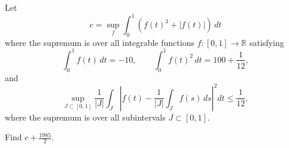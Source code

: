 \documentclass{article}
\begin{document}
Let
\[
c=\sup_f\int_0^1\left(f(t)^3+|f(t)|\right)\,dt
\]
where the supremum is over all integrable functions
\(f:[0,1]\to\mathbb R\) satisfying
\[
\int_0^1 f(t)\,dt=-10,\qquad
\int_0^1 f(t)^2\,dt=100+\frac1{12},
\]
and
\[
\sup_{J\subset[0,1]}\frac1{|J|}\int_J
\left|f(t)-\frac1{|J|}\int_J f(s)\,ds\right|^2dt
\leq\frac1{12},
\]
where the supremum is over all subintervals \(J\subset[0,1]\).

Find \(c+\frac{1985}{2}\).

\end{document}
